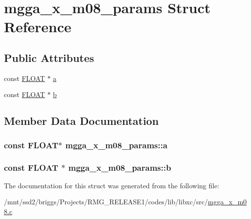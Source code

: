 \hypertarget{structmgga__x__m08__params}{\section{mgga\-\_\-x\-\_\-m08\-\_\-params Struct Reference}
\label{structmgga__x__m08__params}
}
\subsection*{Public Attributes}
\begin{DoxyCompactItemize}
\item 
const \hyperlink{src_2xc__config_8h_ae8690abbffa85934d64d545920e2b108}{F\-L\-O\-A\-T} $\ast$ \hyperlink{structmgga__x__m08__params_a4164304cd8cc25250c57da83c0c61d31}{a}
\item 
const \hyperlink{src_2xc__config_8h_ae8690abbffa85934d64d545920e2b108}{F\-L\-O\-A\-T} $\ast$ \hyperlink{structmgga__x__m08__params_a5231dee47b265738acd0ba7ca7f60dda}{b}
\end{DoxyCompactItemize}


\subsection{Member Data Documentation}
\hypertarget{structmgga__x__m08__params_a4164304cd8cc25250c57da83c0c61d31}{
\subsubsection[{a}]{\setlength{\rightskip}{0pt plus 5cm}const {\bf F\-L\-O\-A\-T}$\ast$ mgga\-\_\-x\-\_\-m08\-\_\-params\-::a}}\label{structmgga__x__m08__params_a4164304cd8cc25250c57da83c0c61d31}
\hypertarget{structmgga__x__m08__params_a5231dee47b265738acd0ba7ca7f60dda}{
\subsubsection[{b}]{\setlength{\rightskip}{0pt plus 5cm}const {\bf F\-L\-O\-A\-T} $\ast$ mgga\-\_\-x\-\_\-m08\-\_\-params\-::b}}\label{structmgga__x__m08__params_a5231dee47b265738acd0ba7ca7f60dda}


The documentation for this struct was generated from the following file\-:\begin{DoxyCompactItemize}
\item 
/mnt/ssd2/briggs/\-Projects/\-R\-M\-G\-\_\-\-R\-E\-L\-E\-A\-S\-E1/codes/lib/libxc/src/\hyperlink{mgga__x__m08_8c}{mgga\-\_\-x\-\_\-m08.\-c}\end{DoxyCompactItemize}
